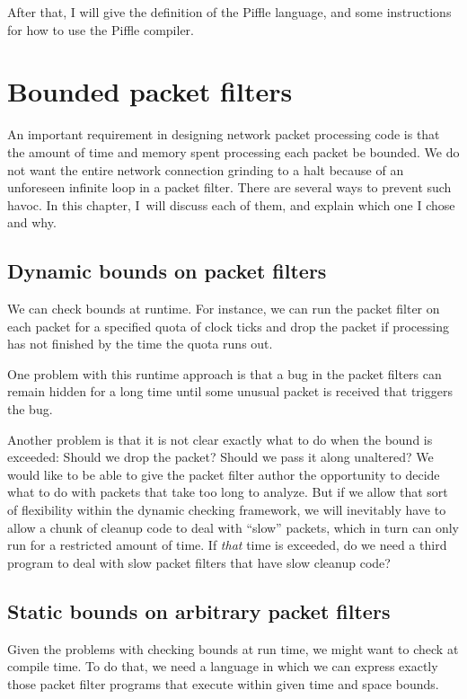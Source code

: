 \documentclass[a4paper,12pt]{scrreprt}
\begin{document}
After that, I will give the definition of the Piffle language, and
some instructions for how to use the Piffle compiler.


\chapter{Bounded packet filters}

An important requirement in designing network packet processing code
is that the amount of time and memory spent processing each packet be
bounded.  We do not want the entire network connection grinding to a
halt because of an unforeseen infinite loop in a packet filter. There
are several ways to prevent such havoc. In this chapter, I~will
discuss each of them, and explain which one I chose and why. 

\section{Dynamic bounds on packet filters}

We can check bounds at runtime. For instance, we can run the packet
filter on each packet for a specified quota of clock ticks and drop
the packet if processing has not finished by the time the quota runs
out.

One problem with this runtime approach is that a bug in the packet
filters can remain hidden for a long time until some unusual packet is
received that triggers the bug.

Another problem is that it is not clear exactly what to do when the
bound is exceeded: Should we drop the packet? Should we pass it along
unaltered? We would like to be able to give the packet filter author
the opportunity to decide what to do with packets that take too long
to analyze. But if we allow that sort of flexibility within the
dynamic checking framework, we will inevitably have to allow a chunk
of cleanup code to deal with ``slow'' packets, which in turn can only
run for a restricted amount of time. If \textit{that} time is
exceeded, do we need a third program to deal with slow packet filters
that have slow cleanup code?

\section{Static bounds on arbitrary packet filters}

Given the problems with checking bounds at run time, we might want to
check at compile time. To do that, we need a language in which we can
express exactly those packet filter programs that execute within given
time and space bounds.
\end{document}
